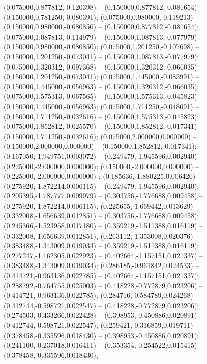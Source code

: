  (0.075000,0.877812,-0.120398) -- (0.150000,0.877812,-0.081654) -- (0.150000,0.781250,-0.080391);
 (0.075000,0.980000,-0.119213) -- (0.150000,0.980000,-0.080850) -- (0.150000,0.877812,-0.081654);
 (0.075000,1.087813,-0.114979) -- (0.150000,1.087813,-0.077979) -- (0.150000,0.980000,-0.080850);
 (0.075000,1.201250,-0.107698) -- (0.150000,1.201250,-0.073041) -- (0.150000,1.087813,-0.077979);
 (0.075000,1.320312,-0.097368) -- (0.150000,1.320312,-0.066035) -- (0.150000,1.201250,-0.073041);
 (0.075000,1.445000,-0.083991) -- (0.150000,1.445000,-0.056963) -- (0.150000,1.320312,-0.066035);
 (0.075000,1.575313,-0.067565) -- (0.150000,1.575313,-0.045823) -- (0.150000,1.445000,-0.056963);
 (0.075000,1.711250,-0.048091) -- (0.150000,1.711250,-0.032616) -- (0.150000,1.575313,-0.045823);
 (0.075000,1.852812,-0.025570) -- (0.150000,1.852812,-0.017341) -- (0.150000,1.711250,-0.032616);
 (0.075000,2.000000,0.000000) -- (0.150000,2.000000,0.000000) -- (0.150000,1.852812,-0.017341);
 (0.167050,-1.949751,0.003072) -- (0.249479,-1.945596,0.002940) -- (0.225000,-2.000000,0.000000);
 (0.150000,-2.000000,0.000000) -- (0.225000,-2.000000,0.000000) ;
 (0.185636,-1.880225,0.006420) -- (0.275920,-1.872214,0.006115) -- (0.249479,-1.945596,0.002940);
 (0.205395,-1.787777,0.009979) -- (0.303756,-1.776688,0.009458) -- (0.275920,-1.872214,0.006115);
 (0.225655,-1.669442,0.013629) -- (0.332008,-1.656639,0.012851) -- (0.303756,-1.776688,0.009458);
 (0.245366,-1.523958,0.017180) -- (0.359219,-1.511388,0.016119) -- (0.332008,-1.656639,0.012851);
 (0.263112,-1.353008,0.020376) -- (0.383488,-1.343009,0.019034) -- (0.359219,-1.511388,0.016119);
 (0.277247,-1.162305,0.022923) -- (0.402664,-1.157151,0.021337) -- (0.383488,-1.343009,0.019034);
 (0.286185,-0.961842,0.024533) -- (0.414721,-0.963136,0.022785) -- (0.402664,-1.157151,0.021337);
 (0.288792,-0.764755,0.025003) -- (0.418228,-0.772879,0.023206) -- (0.414721,-0.963136,0.022785);
 (0.284716,-0.584789,0.024268) -- (0.412744,-0.598721,0.022547) -- (0.418228,-0.772879,0.023206);
 (0.274503,-0.433266,0.022428) -- (0.398953,-0.450886,0.020891) -- (0.412744,-0.598721,0.022547);
 (0.259421,-0.316859,0.019711) -- (0.378458,-0.335596,0.018430) -- (0.398953,-0.450886,0.020891);
 (0.241100,-0.237018,0.016411) -- (0.353354,-0.254522,0.015415) -- (0.378458,-0.335596,0.018430);
